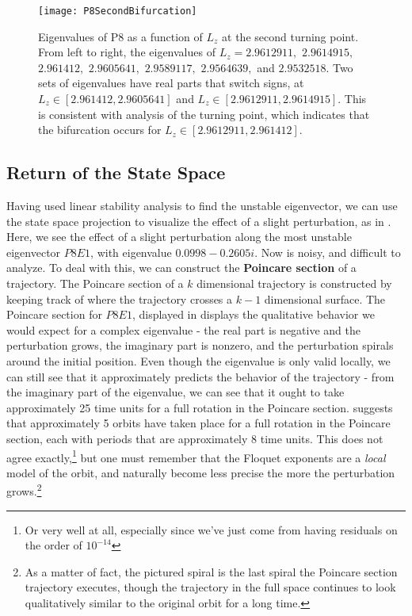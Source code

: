 \begin{figure}[h]
\texttt{[image: P8SecondBifurcation]}
\caption{Eigenvalues of P8 as a function of $L_z$ at the second turning point. From left to right, the eigenvalues of  $L_z =  2.9612911,$ $2.9614915,$ $2.961412,$ $2.9605641,$ $2.9589117,$ $2.9564639,$ and $2.9532518$. Two sets of eigenvalues have real parts that switch signs, at $L_z \in [2.961412,2.9605641]$ and $L_z \in [ 2.9612911,2.9614915]$. This is consistent with analysis of the turning point, which indicates that the bifurcation occurs for $L_z \in [ 2.9612911, 2.961412]$.}\label{fig:P8SecondBifurcation}
\end{figure}

\subsection{Return of the State Space}

Having used linear stability analysis to find the unstable eigenvector, we can use the state space projection to visualize the effect of a slight perturbation, as  in . Here, we see the effect of a slight perturbation along the most unstable eigenvector $P8E1$, with eigenvalue $0.0998 - 0.2605 i$. Now  is noisy, and difficult to analyze. To deal with this, we can construct the {\bf Poincare section} of a trajectory. The Poincare section of a $k$ dimensional trajectory is constructed by keeping track of where the trajectory crosses a $k-1$ dimensional surface. The Poincare section for  $P8E1$, displayed in  displays the qualitative behavior we would expect for a complex eigenvalue - the real part is negative and the perturbation grows, the imaginary part is nonzero, and the perturbation spirals around the initial position. Even though the eigenvalue is only valid locally, we can still see that it approximately predicts the behavior of the trajectory - from the imaginary part of the eigenvalue, we can see that it ought to take approximately 25 time units for a full rotation in the Poincare section.  suggests that approximately 5 orbits have taken place for a full rotation in the Poincare section, each with periods that are approximately 8 time units. This does not agree exactly,\footnote{Or very well at all, especially since we've just come from having residuals on the order of $10^{-14}$} but one must remember that the Floquet exponents are a \emph{local} model of the orbit, and naturally become less precise the more the perturbation grows.\footnote{As a matter of fact, the pictured spiral is the last spiral the Poincare section trajectory executes, though the trajectory in the full space continues to look qualitatively similar to the original orbit for a long time.}   


